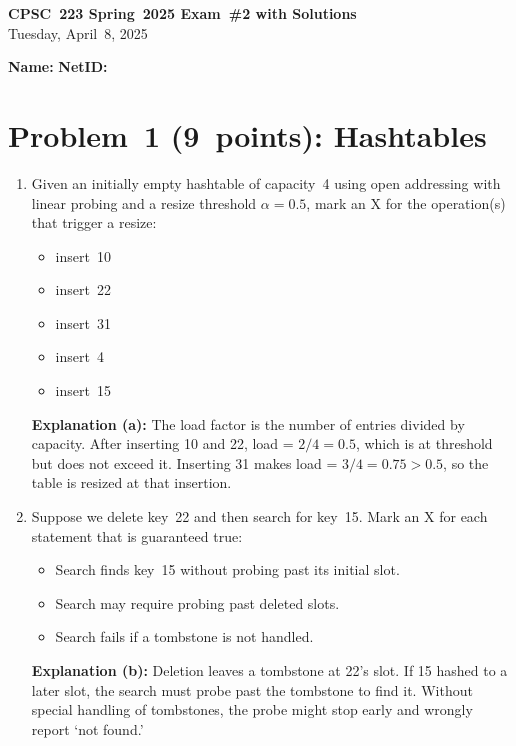 \documentclass[12pt]{article}
\begin{document}
\begin{center}
  \textbf{CPSC 223 Spring 2025 Exam \#2 with Solutions}\\
  Tuesday, April 8, 2025
\end{center}

\vspace{1em}
\noindent
\textbf{Name:} \underline{\hspace{3in}}
\quad
\textbf{NetID:} \underline{\hspace{2in}}

\vspace{1em}

\section*{Problem 1 (9 points): Hashtables}
\begin{enumerate}[label=\alph*)]
  \item Given an initially empty hashtable of capacity 4 using open addressing with linear probing and a resize threshold \(\alpha=0.5\), mark an X for the operation(s) that trigger a resize:
    \begin{itemize}
      \item[\ ] insert 10
      \item[\ ] insert 22
      \item[X] insert 31
      \item[\ ] insert 4
      \item[\ ] insert 15
    \end{itemize}

    \textbf{Explanation (a):}  
    The load factor is the number of entries divided by capacity. After inserting 10 and 22, load = \(2/4 = 0.5\), which is at threshold but does not exceed it. Inserting 31 makes load = \(3/4 = 0.75 > 0.5\), so the table is resized at that insertion.

  \item Suppose we delete key 22 and then search for key 15.  Mark an X for each statement that is guaranteed true:
    \begin{itemize}
      \item[\ ] Search finds key 15 without probing past its initial slot.
      \item[X] Search may require probing past deleted slots.
      \item[X] Search fails if a tombstone is not handled.
    \end{itemize}

    \textbf{Explanation (b):}  
    Deletion leaves a tombstone at 22’s slot. If 15 hashed to a later slot, the search must probe past the tombstone to find it. Without special handling of tombstones, the probe might stop early and wrongly report ‘not found.’


\end{enumerate}
\end{document}
